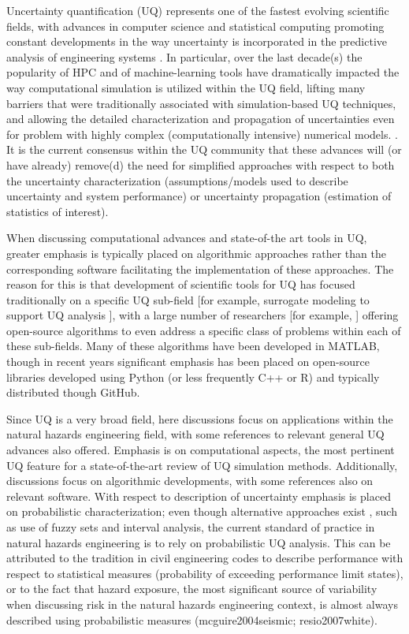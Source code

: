 Uncertainty quantification (UQ) represents one of the fastest evolving scientific fields, with advances in computer science and statistical computing promoting constant developments in the way uncertainty is incorporated in the predictive analysis of engineering systems \citep{smith2013uncertainty}. In particular, over the last decade(s) the popularity of HPC and of machine-learning tools have dramatically impacted the way computational simulation is utilized within the UQ field, lifting many barriers that were traditionally associated with simulation-based UQ techniques, and allowing the detailed characterization and propagation of uncertainties even for problem with highly complex (computationally intensive) numerical models. . It is the current consensus within the UQ community that these advances will (or have already) remove(d) the need for simplified approaches with respect to both the uncertainty characterization (assumptions/models used to describe uncertainty and system performance) or uncertainty propagation (estimation of statistics of interest). 

When discussing computational advances and state-of-the art tools in UQ, greater emphasis is typically placed on algorithmic approaches rather than the corresponding software facilitating the implementation of these approaches. The reason for this is that development of scientific tools for UQ has focused traditionally on a specific UQ sub-field [for example, surrogate modeling to support UQ analysis \citep{lophaven2002dacea,gorissen2010surrogate}], with a large number of researchers [for example, \citep{bect2017bayesian,clement2018methods}] offering open-source algorithms to even address a specific class of problems within each of these sub-fields. Many of these algorithms have been developed in MATLAB, though in recent years significant emphasis has been placed on open-source libraries developed using Python (or less frequently C++ or R) and typically distributed though GitHub.    

Since UQ is a very broad field, here discussions focus on applications within the natural hazards engineering field, with some references to relevant general UQ advances also offered. Emphasis is on computational aspects, the most pertinent UQ feature for a state-of-the-art review of UQ simulation methods. Additionally, discussions focus on algorithmic developments, with some references also on relevant software. With respect to description of uncertainty emphasis is placed on probabilistic characterization; even though alternative approaches exist \citep{beer2013imprecise}, such as use of fuzzy sets and interval analysis, the current standard of practice in natural hazards engineering is to rely on probabilistic UQ analysis. This can be attributed to the tradition in civil engineering codes to describe performance with respect to statistical measures (probability of exceeding performance limit states), or to the fact that hazard exposure, the most significant source of variability when discussing risk in the natural hazards engineering context, is almost always described using probabilistic measures (mcguire2004seismic; resio2007white). 

